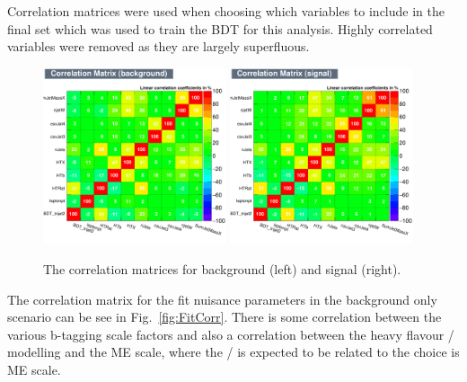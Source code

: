 Correlation matrices were used when choosing which variables to include in the final set which was used to train the BDT for this analysis. Highly correlated variables were removed as they are largely superfluous.

\begin{figure}[ht!]
    \includegraphics[width=0.48\textwidth]{images/Run2/CorrelationMatrixB.pdf}
    \includegraphics[width=0.48\textwidth]{images/Run2/CorrelationMatrixS.pdf}
    \caption{The correlation matrices for background (left) and signal (right).}
    \label{fig:corrMat}
\end{figure}

The correlation matrix for the fit nuisance parameters in the background only scenario can be see in Fig.~\ref{fig:FitCorr}. There is some correlation between the various b-tagging scale factors and also a correlation between the heavy flavour \heavyflavourone / \heavyflavourtwo modelling and the \ttbar ME scale, where the \heavyflavourone / \heavyflavourtwo is expected to be related to the choice is ME scale.

